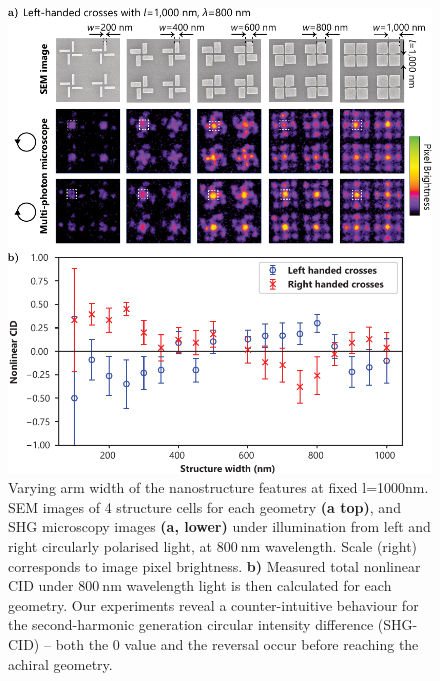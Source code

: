 \begin{figure}[htb!]	
    \centering	
    \includegraphics[scale=1]{./figures/results/EnantiomorphingChiralCrosses/l1000data.pdf}
    \caption{\label{fig:results:EnantiomorphingChiralCrosses:l1000data}
    Varying arm width of the nanostructure features at fixed l=1000nm. SEM images of 4 structure cells for each geometry \textbf{(a top)}, and SHG microscopy images \textbf{(a, lower)} under illumination from left and right circularly polarised light, at $\SI{800}{\nano\m}$ wavelength. Scale (right) corresponds to image pixel brightness. \textbf{b)} Measured total nonlinear CID under $\SI{800}{\nano\m}$ wavelength light is then calculated for each geometry. Our experiments reveal a counter-intuitive behaviour for the second-harmonic generation circular intensity difference (SHG-CID) – both the 0 value and the reversal occur before reaching the achiral geometry.}	
\end{figure}

